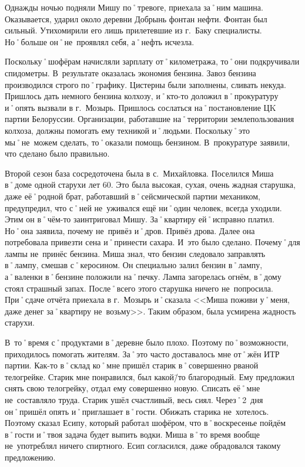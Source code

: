 Однажды ночью подняли Мишу по˚тревоге, приехала за˚ним машина. Оказывается, ударил около деревни Добрынь фонтан нефти. Фонтан был сильный. Утихомирили его лишь прилетевшие из г.~Баку специалисты. Но˚больше он˚не~проявлял себя, а˚нефть исчезла. 

Поскольку˚шофёрам начисляли зарплату от˚километража, то˚они подкручивали спидометры. В~результате оказалась экономия бензина. Завоз бензина производился строго по˚графику. Цистерны были заполнены, сливать некуда. Пришлось дать немного бензина колхозу, и˚кто-то доложил в˚прокуратуру и˚опять вызвали в г.~Мозырь. Пришлось сослаться на˚постановление ЦK партии Белоруссии. Организации, работавшие на˚территории землепользования колхоза, должны помогать ему техникой и˚людьми. Поскольку˚это мы˚не~можем сделать, то˚оказали помощь бензином. В~прокуратуре заявили, что сделано было правильно.

Второй сезон база сосредоточена была в с.~Михайловка. Поселился Миша в˚доме одной старухи лет 60. Это была высокая, сухая, очень жадная старушка, даже её˚родной брат, работавший в˚сейсмической партии механиком, предупредил, что с˚ней не~уживался ещё ни˚один человек, всегда уходили. Этим он в˚чём-то заинтриговал Мишу. За˚квартиру ей˚исправно платил. Но˚она заявила, почему не~привёз и˚дров. Привёз дрова. Далее она потребовала привезти сена и˚принести сахара. И~это было сделано. Почему˚для лампы не~принёс бензина. Миша знал, что бензин следовало заправлять в˚лампу, смешав с˚керосином. Он специально залил бензин в˚лампу, а˚валенки в˚бензине положили на˚печку. Лампа загорелась огнём, в˚дому стоял страшный запах. После˚всего этого старушка ничего не~попросила. При˚сдаче отчёта приехала в г.~Мозырь и˚сказала <<Миша поживи у˚меня, даже денег за˚квартиру не~возьму>>. Таким образом, была усмирена жадность старухи.

В~то˚время с˚продуктами в˚деревне было плохо. Поэтому по˚возможности, приходилось помогать жителям. За˚это часто доставалось мне от˚жён ИТР партии. Как-то в˚склад ко˚мне пришёл старик в˚совершенно рваной телогрейке. Старик мне понравился, был какой\=/то благородный. Ему предложил снять свою телогрейку, отдал ему совершенно новую. Списать её˚мне не~составляло труда. Старик ушёл счастливый, весь сиял. Через˚2~дня он˚пришёл опять и˚приглашает в˚гости. Обижать старика не~хотелось. Поэтому сказал Есипу, который работал шофёром, что в˚воскресенье пойдём в˚гости и˚твоя задача будет выпить водки. Миша в˚то время вообще не~употреблял ничего спиртного. Есип согласился, даже обрадовался такому предложению. 

